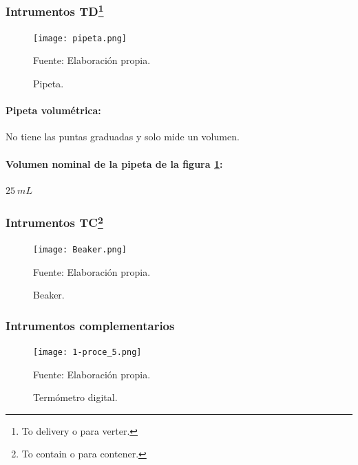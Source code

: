 \documentclass[12pt,letterpaper]{exam}
\begin{document}
\begin{multicols}{2}

\subsubsection*{Intrumentos TD\footnote{To delivery o para verter.}}


\begin{figure}[H]
\centering
\texttt{[image: pipeta.png]}
\caption{Pipeta.}
\begin{center}
Fuente: Elaboración propia.
\end{center}
\label{fig:pipeta}
\end{figure}


\paragraph{Pipeta volumétrica:} No tiene las puntas graduadas y solo mide un volumen.

\paragraph{Volumen nominal de la pipeta de la figura \ref{fig:pipeta}:} $25 \ mL$


\subsubsection*{Intrumentos TC\footnote{To contain o para contener.}}

\begin{figure}[H]
\centering
\texttt{[image: Beaker.png]}
\caption{Beaker.}
\begin{center}
Fuente: Elaboración propia.
\end{center}
\label{fig:Beaker}
\end{figure}


\subsubsection*{Intrumentos complementarios}

\begin{figure}[H]
\centering
\texttt{[image: 1-proce\_5.png]}
\caption{Termómetro digital.}
\begin{center}
Fuente: Elaboración propia.
\end{center}
\label{fig:Termómetro}
\end{figure}



\end{multicols}
\end{document}
